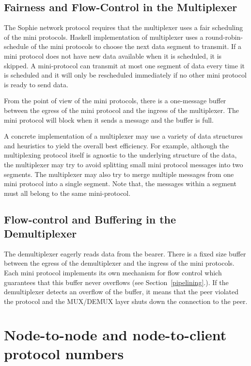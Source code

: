 \subsection{Fairness and Flow-Control in the Multiplexer}
The Sophie network protocol requires that the multiplexer uses a fair
scheduling of the mini protocols.  Haskell implementation of
multiplexer uses a round-robin-schedule of the mini protocols to choose the
next data segment to transmit.  If a mini protocol does not have new data
available when it is scheduled, it is skipped.  A mini-protocol can transmit at
most one segment of data every time it is scheduled and it will only be
rescheduled immediately if no other mini protocol is ready to send data.

From the point of view of the mini protocols, there is a one-message buffer between the egress of
the mini protocol and the ingress of the multiplexer.
The mini protocol will block when it sends a message and the buffer is full.

A concrete implementation of a multiplexer may use a variety of data structures and heuristics to
yield the overall best efficiency.
For example, although the multiplexing protocol itself is agnostic to the underlying structure of
the data, the multiplexer may try to avoid splitting small mini protocol messages into two segments.
The multiplexer may also try to merge multiple messages from one mini protocol into a
single segment.
Note that, the messages within a segment must all belong to the same mini-protocol.

\subsection{Flow-control and Buffering in the Demultiplexer}
\label{mux-flow-control}
The demultiplexer eagerly reads data from the bearer.
There is a fixed size buffer between the egress of the demultiplexer and the ingress of
the mini protocols.
Each mini protocol implements its own mechanism for flow control which guarantees that this buffer
never overflows (see Section~\ref{pipelining}.).
If the demultiplexer detects an overflow of the buffer, it means that the peer violated the
protocol and the MUX/DEMUX layer shuts down the connection to the peer.


\section{Node-to-node and node-to-client protocol numbers}
\noindent{}
\newline{}
\newline{}

